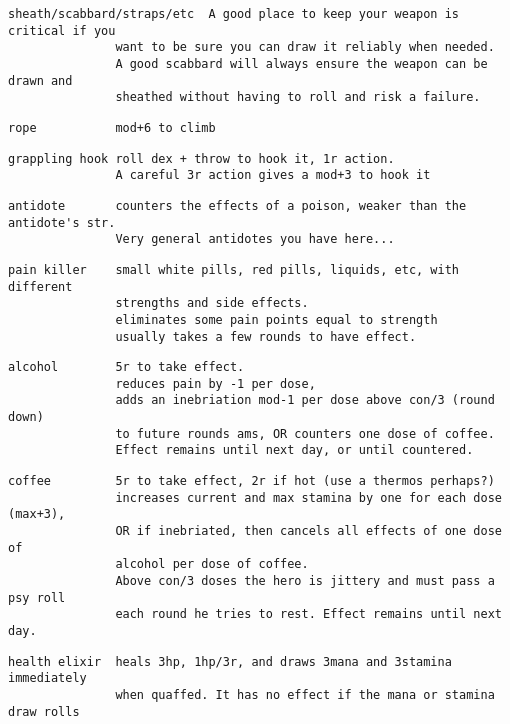 \small \begin{samepage} \begin{verbatim}
sheath/scabbard/straps/etc  A good place to keep your weapon is critical if you
               want to be sure you can draw it reliably when needed. 
               A good scabbard will always ensure the weapon can be drawn and
               sheathed without having to roll and risk a failure.
\end{verbatim} \blocklistgap \begin{verbatim}
rope           mod+6 to climb
\end{verbatim} \blocklistgap \begin{verbatim}
grappling hook roll dex + throw to hook it, 1r action.
               A careful 3r action gives a mod+3 to hook it
\end{verbatim} \blocklistgap \begin{verbatim}
antidote       counters the effects of a poison, weaker than the antidote's str.
               Very general antidotes you have here...
\end{verbatim} \blocklistgap \begin{verbatim}
pain killer    small white pills, red pills, liquids, etc, with different
               strengths and side effects.
               eliminates some pain points equal to strength
               usually takes a few rounds to have effect.
\end{verbatim} \blocklistgap \begin{verbatim}
alcohol        5r to take effect.
               reduces pain by -1 per dose,
               adds an inebriation mod-1 per dose above con/3 (round down)
               to future rounds ams, OR counters one dose of coffee.
               Effect remains until next day, or until countered.
\end{verbatim} \blocklistgap \begin{verbatim}
coffee         5r to take effect, 2r if hot (use a thermos perhaps?)
               increases current and max stamina by one for each dose (max+3),
               OR if inebriated, then cancels all effects of one dose of
               alcohol per dose of coffee.
               Above con/3 doses the hero is jittery and must pass a psy roll 
               each round he tries to rest. Effect remains until next day.
\end{verbatim} \blocklistgap \begin{verbatim}
health elixir  heals 3hp, 1hp/3r, and draws 3mana and 3stamina immediately
               when quaffed. It has no effect if the mana or stamina draw rolls

\end{verbatim}
\end{samepage}
